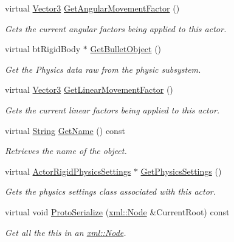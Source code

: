 \begin{DoxyCompactItemize}
virtual \hyperlink{classphys_1_1Vector3}{Vector3} \hyperlink{classphys_1_1ActorRigid_a0d29535332ac613f9a14ea32e843d612}{GetAngularMovementFactor} ()
\begin{DoxyCompactList}\small\item\em Gets the current angular factors being applied to this actor. \item\end{DoxyCompactList}\item 
virtual btRigidBody $\ast$ \hyperlink{classphys_1_1ActorRigid_a9c8f1f4b99f41ab97050f5b15c802f14}{GetBulletObject} ()
\begin{DoxyCompactList}\small\item\em Get the Physics data raw from the physic subsystem. \item\end{DoxyCompactList}\item 
virtual \hyperlink{classphys_1_1Vector3}{Vector3} \hyperlink{classphys_1_1ActorRigid_ae29ab60e2c0e4762d2698c60b8df1d23}{GetLinearMovementFactor} ()
\begin{DoxyCompactList}\small\item\em Gets the current linear factors being applied to this actor. \item\end{DoxyCompactList}\item 
virtual \hyperlink{namespacephys_aa03900411993de7fbfec4789bc1d392e}{String} \hyperlink{classphys_1_1ActorRigid_a63952e0b7ab7176ae60d96756dd84b43}{GetName} () const 
\begin{DoxyCompactList}\small\item\em Retrieves the name of the object. \item\end{DoxyCompactList}\item 
virtual \hyperlink{classphys_1_1ActorRigidPhysicsSettings}{ActorRigidPhysicsSettings} $\ast$ \hyperlink{classphys_1_1ActorRigid_ac531871f990894cf64d0ece918eb18d0}{GetPhysicsSettings} ()
\begin{DoxyCompactList}\small\item\em Gets the physics settings class associated with this actor. \item\end{DoxyCompactList}\item 
virtual void \hyperlink{classphys_1_1ActorRigid_add4e731eb3a5481d05e2d0f543745fcd}{ProtoSerialize} (\hyperlink{classphys_1_1xml_1_1Node}{xml::Node} \&CurrentRoot) const 
\begin{DoxyCompactList}\small\item\em Get all the this in an \hyperlink{classphys_1_1xml_1_1Node}{xml::Node}. \item\end{DoxyCompactList}\item 

\end{DoxyCompactItemize}
